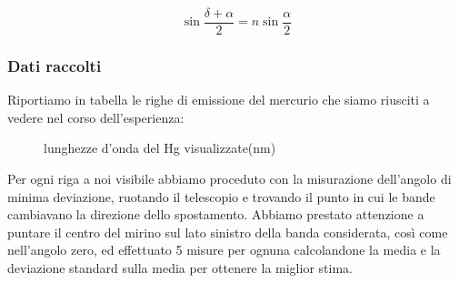 \documentclass[a4paper]{article}
\theoremstyle{definition}
\begin{document}
 \[\sin \frac{\delta + \alpha}{2} = n \sin \frac{\alpha}{2}\]
 
\subsubsection{Dati raccolti}

Riportiamo in tabella le righe di emissione del mercurio che siamo riusciti a vedere nel corso dell'esperienza:

\begin{figure}[!htbp]
		\captionsetup{labelformat=empty}
		\caption{lunghezze d'onda del Hg visualizzate(nm)}
	\end{figure}
	
	
\noindent Per ogni riga a noi visibile abbiamo proceduto con la misurazione dell'angolo di minima deviazione, ruotando il telescopio e trovando il punto in cui le bande cambiavano la direzione dello spostamento. Abbiamo prestato attenzione a puntare il centro del mirino sul lato sinistro della banda considerata, così come nell'angolo zero, ed effettuato 5 misure per ognuna calcolandone la media e la deviazione standard sulla media per ottenere la miglior stima.
\end{document}
